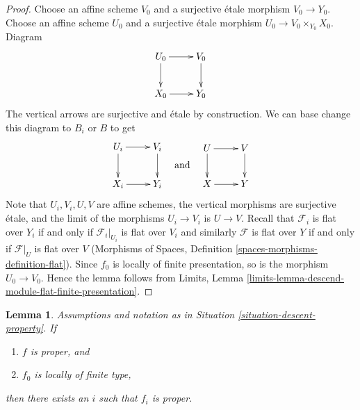\documentclass{stacks-project}
\theoremstyle{plain}
\newtheorem{lemma}[subsection]{Lemma}
\theoremstyle{definition}
\theoremstyle{remark}
\numberwithin{equation}{subsection}
\begin{document}
\begin{proof}
Choose an affine scheme $V_0$ and a surjective \'etale morphism
$V_0 \to Y_0$. Choose an affine scheme $U_0$ and a surjective \'etale
morphism $U_0 \to V_0 \times_{Y_0} X_0$. Diagram
$$
\xymatrix{
U_0 \ar[d] \ar[r] & V_0 \ar[d] \\
X_0 \ar[r] & Y_0
}
$$
The vertical arrows are surjective and \'etale by construction.
We can base change this diagram to $B_i$ or $B$ to get
$$
\vcenter{
\xymatrix{
U_i \ar[d] \ar[r] & V_i \ar[d] \\
X_i \ar[r] & Y_i
}
}
\quad\text{and}\quad
\vcenter{
\xymatrix{
U \ar[d] \ar[r] & V \ar[d] \\
X \ar[r] & Y
}
}
$$
Note that $U_i, V_i, U, V$ are affine schemes, the vertical morphisms are
surjective \'etale, and the limit of the morphisms $U_i \to V_i$ is
$U \to V$. Recall that $\mathcal{F}_i$ is flat over $Y_i$ if and only if
$\mathcal{F}_i|_{U_i}$ is flat over $V_i$ and similarly $\mathcal{F}$ is flat
over $Y$ if and only if $\mathcal{F}|_U$ is flat over $V$
(Morphisms of Spaces, Definition \ref{spaces-morphisms-definition-flat}).
Since $f_0$ is locally of finite presentation, so is the morphism
$U_0 \to V_0$. Hence the lemma follows
from Limits, Lemma \ref{limits-lemma-descend-module-flat-finite-presentation}.
\end{proof}

\begin{lemma}
\label{lemma-eventually-proper}
Assumptions and notation as in Situation \ref{situation-descent-property}.
If
\begin{enumerate}
\item $f$ is proper, and
\item $f_0$ is locally of finite type,
\end{enumerate}
then there exists an $i$ such that $f_i$ is proper.
\end{lemma}
\end{document}
